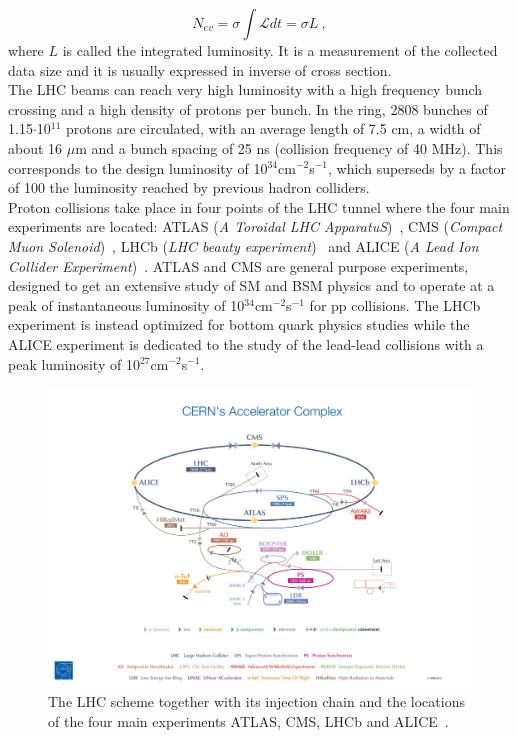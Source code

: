 \begin{equation}
N_{ev} = \sigma \int \mathcal{L}dt = \sigma L~\mathrm{,}
\end{equation}
where $L$ is called the integrated luminosity. It is a measurement of the collected data size and it is usually expressed in inverse of cross section.\\
The LHC beams can reach very high luminosity with a high frequency bunch crossing and a high density of protons per bunch. In the ring, 2808 bunches of 1.15$\cdot$10$^{11}$ protons are circulated, with an average length of 7.5 cm, a width of about 16 $\mu$m and a bunch spacing of 25 ns (collision frequency of 40 MHz). This corresponds to the design luminosity of 10$^{34}$cm$^{−2}$s$^{−1}$, which superseds by a factor of 100 the luminosity reached by previous hadron colliders.\\

Proton collisions take place in four points of the LHC tunnel where the four main experiments are located: ATLAS ({\itshape A Toroidal LHC ApparatuS})~\cite{Aad:2008zzm}, CMS ({\itshape Compact Muon Solenoid})~\cite{Chatrchyan:2008zzk}, LHCb ({\itshape LHC beauty experiment})~\cite{Alves:2008zz} and ALICE ({\itshape A Lead Ion Collider Experiment})~\cite{Aamodt:2008zz}.
ATLAS and CMS are general purpose experiments, designed to get an extensive study of SM and BSM physics
and to operate at a peak of instantaneous luminosity of 10$^{34}$cm$^{−2}$s$^{−1}$ for pp collisions. 
The LHCb experiment is instead optimized for bottom quark physics studies while the ALICE experiment is dedicated to the study of the lead-lead collisions with a peak luminosity of 10$^{27}$cm$^{−2}$s$^{−1}$.

\begin{figure}[h]
 \begin{center}
  \includegraphics[width=\textwidth]{chapters/Chapter2-CMSatLHC/Figures/LHC2.jpg}
 \end{center}
 \caption{\small The LHC scheme together with its injection chain and the locations of the four main experiments ATLAS, CMS, LHCb and ALICE~\cite{Marcastel:1621583}.}
 \label{fig:LHC}
\end{figure}

